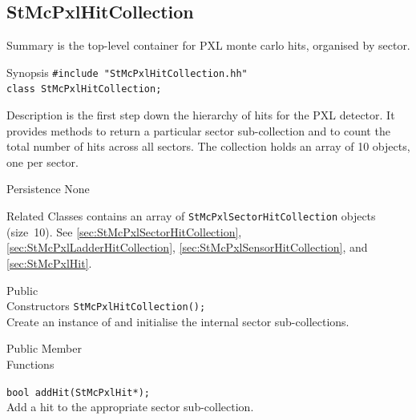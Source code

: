 \subsection{StMcPxlHitCollection}
 
\label{sec:StMcPxlHitCollection}
\begin{Entry}
\item[Summary]
     is the top-level container for PXL monte
    carlo hits, organised by sector.

\item[Synopsis]
    \verb+#include "StMcPxlHitCollection.hh"+\\
    \verb+class StMcPxlHitCollection;+\\

\item[Description]
     is the first step down the hierarchy of hits
    for the PXL detector.  It provides methods to return a particular sector
    sub-collection and to count the total number of hits across all sectors.
    The collection holds an array of 10 
    objects, one per sector.

\item[Persistence]
    None

\item[Related Classes]
     contains an array of
    {\tt StMcPxlSectorHitCollection} objects (size~10).  See
     \ref{sec:StMcPxlSectorHitCollection},
     \ref{sec:StMcPxlLadderHitCollection},
     \ref{sec:StMcPxlSensorHitCollection},
    and  \ref{sec:StMcPxlHit}.

\item[Public\\ Constructors]
    \verb+StMcPxlHitCollection();+\\
    Create an instance of  and
    initialise the internal sector sub-collections.

\item[Public Member\\ Functions]

    \verb+bool addHit(StMcPxlHit*);+\\
    Add a hit to the appropriate sector sub-collection.


\end{Entry}
